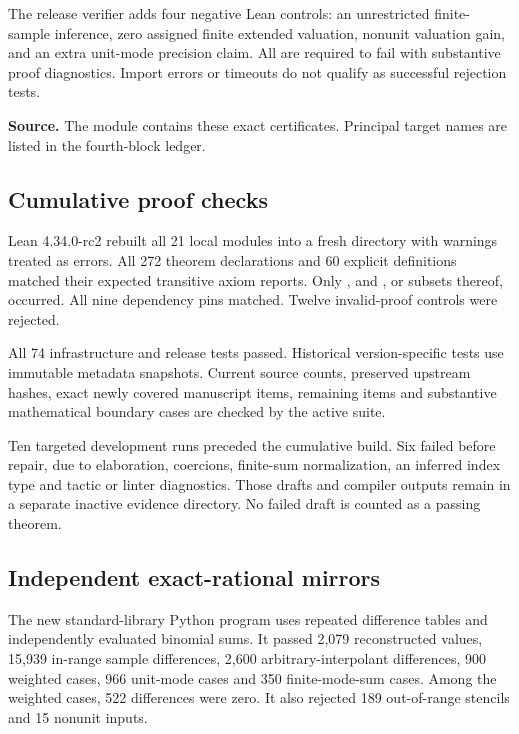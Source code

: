 The release verifier adds four negative Lean controls: an unrestricted finite-sample inference, zero assigned finite extended valuation, nonunit valuation gain, and an extra unit-mode precision claim. All are required to fail with substantive proof diagnostics. Import errors or timeouts do not qualify as successful rejection tests.

\textbf{Source.} The module  contains these exact certificates. Principal target names are listed in the fourth-block ledger.
\par\medskip
{}
\subsection*{Cumulative proof checks}
Lean 4.34.0-rc2 rebuilt all 21 local modules into a fresh directory with warnings treated as errors. All 272 theorem declarations and 60 explicit definitions matched their expected transitive axiom reports. Only ,  and , or subsets thereof, occurred. All nine dependency pins matched. Twelve invalid-proof controls were rejected.

All 74 infrastructure and release tests passed. Historical version-specific tests use immutable metadata snapshots. Current source counts, preserved upstream hashes, exact newly covered manuscript items, remaining items and substantive mathematical boundary cases are checked by the active suite.

Ten targeted development runs preceded the cumulative build. Six failed before repair, due to elaboration, coercions, finite-sum normalization, an inferred index type and tactic or linter diagnostics. Those drafts and compiler outputs remain in a separate inactive evidence directory. No failed draft is counted as a passing theorem.

\subsection*{Independent exact-rational mirrors}
The new standard-library Python program uses repeated difference tables and independently evaluated binomial sums. It passed 2,079 reconstructed values, 15,939 in-range sample differences, 2,600 arbitrary-interpolant differences, 900 weighted cases, 966 unit-mode cases and 350 finite-mode-sum cases. Among the weighted cases, 522 differences were zero. It also rejected 189 out-of-range stencils and 15 nonunit inputs.

